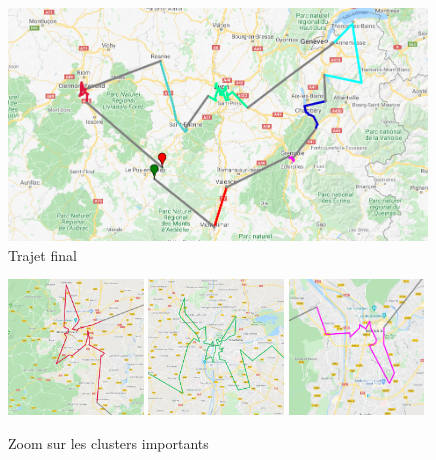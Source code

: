 \documentclass[12pt]{article}
\begin{document}
\begin{figure}[H]
\caption{Trajet final}
\begin{center}
\includegraphics[width=0.99\textwidth]{kmeans-final}
\end{center}
\end{figure}

\newpage
\begin{figure}[H]
\caption{Zoom sur les clusters importants}
\begin{center}
\includegraphics[width=0.32\textwidth]{erreur1}
\includegraphics[width=0.32\textwidth]{erreur2}
\includegraphics[width=0.32\textwidth]{erreur3}
\end{center}
\end{figure}
\end{document}
